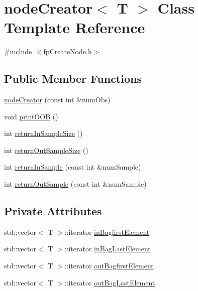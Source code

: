 \hypertarget{classnodeCreator}{}\section{node\+Creator$<$ T $>$ Class Template Reference}
\label{classnodeCreator}


{\ttfamily \#include $<$fp\+Create\+Node.\+h$>$}

\subsection*{Public Member Functions}
\begin{DoxyCompactItemize}
\item 
\hyperlink{classnodeCreator_a460dc030e2aee80345e9c5f1b4fbba7d}{node\+Creator} (const int \&num\+Obs)
\item 
void \hyperlink{classnodeCreator_a08702cdfc2ad2fdd010b0fdf3437d3e4}{print\+O\+OB} ()
\item 
int \hyperlink{classnodeCreator_a78a2ed85f6f25f7f8f1f6f65f3bf3e78}{return\+In\+Sample\+Size} ()
\item 
int \hyperlink{classnodeCreator_a50d306716d731c8d0754d8628c311f11}{return\+Out\+Sample\+Size} ()
\item 
int \hyperlink{classnodeCreator_a93a55fecae013dfac2bf46d4e0be14f5}{return\+In\+Sample} (const int \&num\+Sample)
\item 
int \hyperlink{classnodeCreator_affd4ae08a5562f4a5c7bb0068ecf8e8d}{return\+Out\+Sample} (const int \&num\+Sample)
\end{DoxyCompactItemize}
\subsection*{Private Attributes}
\begin{DoxyCompactItemize}
\item 
std\+::vector$<$ T $>$\+::iterator \hyperlink{classnodeCreator_a4ed8c038ff57c273b8b33a670d21214c}{in\+Bagfirst\+Element}
\item 
std\+::vector$<$ T $>$\+::iterator \hyperlink{classnodeCreator_aaa5de4d5498d0c35696736240efb410f}{in\+Bag\+Last\+Element}
\item 
std\+::vector$<$ T $>$\+::iterator \hyperlink{classnodeCreator_ac5903268052b2d871be3d426054eca05}{out\+Bagfirst\+Element}
\item 
std\+::vector$<$ T $>$\+::iterator \hyperlink{classnodeCreator_a53cb975b730f4a7403186b5c4230da19}{out\+Bag\+Last\+Element}
\end{DoxyCompactItemize}


